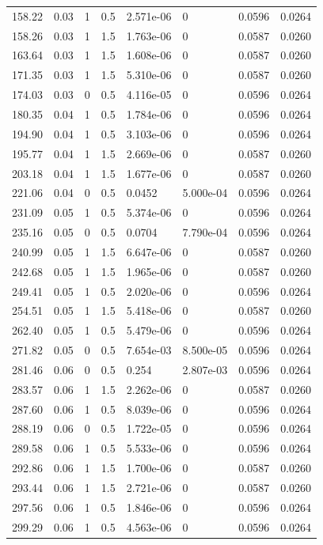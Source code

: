 \documentclass[preview]{standalone}
\begin{document}
{{\begin{tabular}{L{1.2cm}C{1.2cm} C{0.3cm}C{0.5cm} C{1.4cm}C{1.4cm} C{1.4cm}C{1.4cm}}
  158.22  &  0.03  & 1     & 0.5 &  2.571e-06  & 0  & 0.0596 &  0.0264   \\ 
  158.26  &  0.03  & 1     & 1.5 &  1.763e-06  & 0  & 0.0587 &  0.0260   \\ 
  163.64  &  0.03  & 1     & 1.5 &  1.608e-06  & 0  & 0.0587 &  0.0260   \\ 
  171.35  &  0.03  & 1     & 1.5 &  5.310e-06  & 0  & 0.0587 &  0.0260   \\ 
  174.03  &  0.03  & 0     & 0.5 &  4.116e-05  & 0  & 0.0596 &  0.0264   \\ 
  180.35  &  0.04  & 1     & 0.5 &  1.784e-06  & 0  & 0.0596 &  0.0264   \\ 
  194.90  &  0.04  & 1     & 0.5 &  3.103e-06  & 0  & 0.0596 &  0.0264   \\ 
  195.77  &  0.04  & 1     & 1.5 &  2.669e-06  & 0  & 0.0587 &  0.0260   \\ 
  203.18  &  0.04  & 1     & 1.5 &  1.677e-06  & 0  & 0.0587 &  0.0260   \\ 
  221.06  &  0.04  & 0     & 0.5 &  0.0452  & 5.000e-04  & 0.0596 &  0.0264   \\ 
  231.09  &  0.05  & 1     & 0.5 &  5.374e-06  & 0  & 0.0596 &  0.0264   \\ 
  235.16  &  0.05  & 0     & 0.5 &  0.0704  & 7.790e-04  & 0.0596 &  0.0264   \\ 
  240.99  &  0.05  & 1     & 1.5 &  6.647e-06  & 0  & 0.0587 &  0.0260   \\ 
  242.68  &  0.05  & 1     & 1.5 &  1.965e-06  & 0  & 0.0587 &  0.0260   \\ 
  249.41  &  0.05  & 1     & 0.5 &  2.020e-06  & 0  & 0.0596 &  0.0264   \\ 
  254.51  &  0.05  & 1     & 1.5 &  5.418e-06  & 0  & 0.0587 &  0.0260   \\ 
  262.40  &  0.05  & 1     & 0.5 &  5.479e-06  & 0  & 0.0596 &  0.0264   \\ 
  271.82  &  0.05  & 0     & 0.5 &  7.654e-03  & 8.500e-05  & 0.0596 &  0.0264   \\ 
  281.46  &  0.06  & 0     & 0.5 &  0.254  & 2.807e-03  & 0.0596 &  0.0264   \\ 
  283.57  &  0.06  & 1     & 1.5 &  2.262e-06  & 0  & 0.0587 &  0.0260   \\ 
  287.60  &  0.06  & 1     & 0.5 &  8.039e-06  & 0  & 0.0596 &  0.0264   \\ 
  288.19  &  0.06  & 0     & 0.5 &  1.722e-05  & 0  & 0.0596 &  0.0264   \\ 
  289.58  &  0.06  & 1     & 0.5 &  5.533e-06  & 0  & 0.0596 &  0.0264   \\ 
  292.86  &  0.06  & 1     & 1.5 &  1.700e-06  & 0  & 0.0587 &  0.0260   \\ 
  293.44  &  0.06  & 1     & 1.5 &  2.721e-06  & 0  & 0.0587 &  0.0260   \\ 
  297.56  &  0.06  & 1     & 0.5 &  1.846e-06  & 0  & 0.0596 &  0.0264   \\ 
  299.29  &  0.06  & 1     & 0.5 &  4.563e-06  & 0  & 0.0596 &  0.0264   \\ 
\hline 
\end{tabular} 

}}
\end{document}
